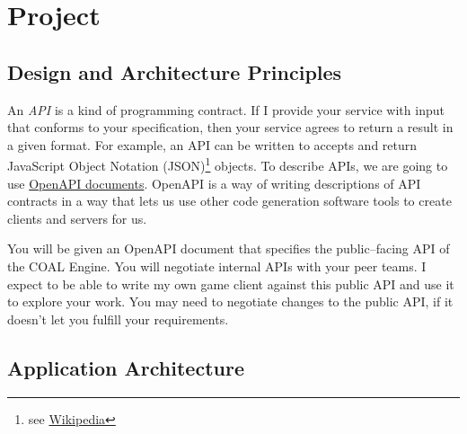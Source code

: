 \documentclass{article}
\newcommand{\enterProblemHeader}[1]{
}
\newcommand{\exitProblemHeader}[1]{
\nobreak\extramarks{#1}{}\nobreak
}
\newcounter{homeworkProblemCounter} %
\newcommand{\homeworkProblemName}{}
\newenvironment{homeworkProblem}[1][Problem \arabic{homeworkProblemCounter}]{ %
\stepcounter{homeworkProblemCounter} %
\renewcommand{\homeworkProblemName}{#1} %
\section{\homeworkProblemName} %
\enterProblemHeader{\homeworkProblemName} %
}{
\exitProblemHeader{\homeworkProblemName} %
}
\newcommand{\homeworkSectionName}{}
\newenvironment{homeworkSection}[1]{ %
\renewcommand{\homeworkSectionName}{#1} %
\subsection{\homeworkSectionName} %
\enterProblemHeader{\homeworkProblemName\ [\homeworkSectionName]} %
}{
\enterProblemHeader{\homeworkProblemName} %
}
\begin{document}
\begin{homeworkProblem}[Project]
\begin{homeworkSection}{Design and Architecture Principles}
	An \textit{API} is a kind of programming contract. If I provide your service with input that conforms to your specification, then your service agrees to return a result in a given format. For example, an API can be written to accepts and return JavaScript Object Notation (JSON)\footnote{see \href{https://en.wikipedia.org/wiki/JSON}{Wikipedia}} objects. To describe APIs, we are going to use \href{https://swagger.io/specification/}{OpenAPI documents}. OpenAPI is a way of writing descriptions of API contracts in a way that lets us use other code generation software tools to create clients and servers for us.

  You will be given an OpenAPI document that specifies the public--facing API of the COAL Engine. You will negotiate internal APIs with your peer teams. I expect to be able to write my own game client against this public API and use it to explore your work. You may need to negotiate changes to the public API, if it doesn't let you fulfill your requirements.
\end{homeworkSection}

\begin{homeworkSection}{Application Architecture}
	
\begin{figure}
\centering
{}
\end{figure}
\end{homeworkSection}
\end{homeworkProblem}
\end{document}
